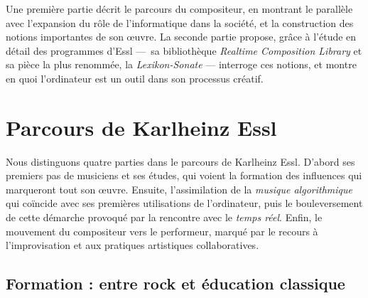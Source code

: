 \documentclass[a4paper,12pt]{article}
\newcommand{\guill}[1]{«~#1~»}
\newcommand{\zitat}[2]{\#Citation(#2)\#}
\begin{document}

Une première partie décrit le parcours du compositeur, en montrant le parallèle avec l'expansion du rôle de l'informatique dans la société, et la construction des notions importantes de son œuvre. La seconde partie propose, grâce à l'étude en détail des programmes d'Essl ---~sa bibliothèque \emph{Realtime Composition Library} et sa pièce la plus renommée, la \emph{Lexikon-Sonate} --- interroge ces notions, et montre en quoi l'ordinateur est un outil dans son processus créatif.

\section{Parcours de Karlheinz Essl}

Nous distinguons quatre parties dans le parcours de Karlheinz Essl. D'abord ses premiers pas de musiciens et ses études, qui voient la formation des influences qui marqueront tout son œuvre. Ensuite, l'assimilation de la \emph{musique algorithmique} qui coïncide avec ses premières utilisations de l'ordinateur, puis le bouleversement de cette démarche provoqué par la rencontre avec le \emph{temps réel}. Enfin, le mouvement du compositeur vers le performeur, marqué par le recours à l'improvisation et aux pratiques artistiques collaboratives.

\subsection{Formation : entre rock et éducation classique}
\end{document}
